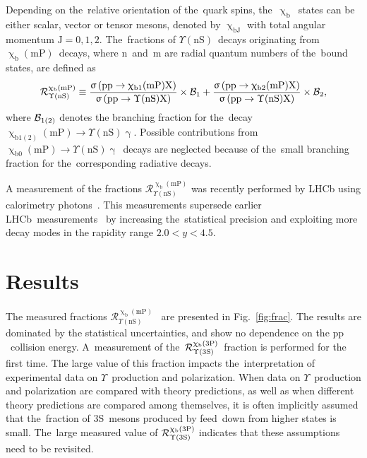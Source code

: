 \documentclass[a4paper]{article}
\def\lhcb {\mbox{LHCb}\xspace}
\def\Pgamma      {\ensuremath{\upgamma}\xspace}
\def\Pchi        {\ensuremath{\upchi}\xspace}
\def\PUpsilon      {\ensuremath{\Upsilon}\xspace}
\def\Pa      {\ensuremath{\mathrm{a}}\xspace}
\def\Pb      {\ensuremath{\mathrm{b}}\xspace}
\def\Pp      {\ensuremath{\mathrm{p}}\xspace}
\def\g      {{\ensuremath{\Pgamma}}\xspace}
\def\bquark    {{\ensuremath{\Pb}}\xspace}
\def\Y#1S{\ensuremath{\PUpsilon\mathrm{(#1S)}}\xspace}%
\def\proton      {{\ensuremath{\Pp}}\xspace}
\def\BF         {{\ensuremath{\cal B}}\xspace}
\def\BR         {\BF}
\newcommand{\decay}[2]{\ensuremath{#1\!\to #2}\xspace}         %
\def\to                 {\ensuremath{\rightarrow}\xspace}
\def\chib           {\ensuremath{\Pchi_{\bquark}}\xspace}
\def\ups            {\ensuremath{\PUpsilon}\xspace}
\def\YnS            {\ensuremath{\PUpsilon\mathrm{(nS)}}\xspace}%
\def\chibthreep     {\ensuremath{\Pchi_{\bquark}\mathrm{(3P)}}\xspace}
\def\chibmp         {\ensuremath{\Pchi_{\bquark}\mathrm{(mP)}}\xspace}
\def\Rmn           {\ensuremath{\mathcal{R}^{\chibmp}_{\YnS}}\xspace}
\begin{document}
Depending on the~relative orientation of the~quark spins,
the~\chib~states can be either scalar, vector or tensor mesons, denoted by
$\Pchi_{\bquark \mathrm{J}}$ with total angular momentum $\mathrm{J}=0,1,2$.
The~fractions of \YnS~decays
originating from \chibmp~decays,
where $\mathrm{n}$~and~$\mathrm{m}$ are radial quantum numbers of
the~bound states, are defined as
\begin{equation}
  \mathcal{R}^{\chibmp}_{\YnS} \equiv
  \dfrac
      {\upsigma  \left( \proton\proton \to \Pchi_{\bquark1}\mathrm{(mP)} \mathrm{X} \right)}
      {\upsigma  \left( \proton\proton \to \YnS    \mathrm{X} \right)}
      \times \BR_1
      + \dfrac
      {\upsigma  \left( \proton\proton \to \Pchi_{\bquark2}\mathrm{(mP)} \mathrm{X} \right)}
      {\upsigma  \left( \proton\proton \to \YnS    \mathrm{X} \right)}
      \times \BR_2
      \label{eq:r},
\end{equation}
where $\BR_{1(2)}$ denotes the branching fraction 
for the~decay \decay{\Pchi_{\bquark1(2)}\mathrm{(mP)}}{\YnS \g}.
Possible contributions from \decay{\Pchi_{\bquark0}\mathrm{(mP)}}{\YnS \g}~decays 
are neglected because  of the~small branching fraction for the~corresponding
radiative decays.

A measurement of the fractions $\mathcal{R}^{\chibmp}_{\YnS}$ was
recently performed by LHCb using calorimetry photons~\cite{Aaij:1746553}.
This measurements supersede earlier \lhcb~measurements~\cite{LHCb-PAPER-2012-015,LHCb-CONF-2012-020}
by increasing the~statistical precision and exploiting more decay modes 
in the rapidity range  $2.0<y<4.5$.
\section{Results}
\label{sec:Conclusion}


The measured fractions \Rmn~\cite{Aaij:1746553} are presented in Fig.~\ref{fig:frac}.
The results are dominated by the statistical uncertainties, and show no dependence on the \proton\proton~collision energy.
A~measurement of the~$\mathcal{R}^{\chibthreep}_{\Y3S}$~fraction is performed for the first time.
The large value of this fraction impacts the~interpretation
of experimental data on \ups~production and polarization.
When data on \ups~production and polarization are compared with theory predictions,
as well as when different theory predictions are compared among themselves, it is often implicitly assumed
that the~fraction of \Y3S~mesons produced by feed~down from higher states is small.
The~large measured value of  $\mathcal{R}^{\chibthreep}_{\Y3S}$
indicates that these assumptions need to be revisited. 
\end{document}
